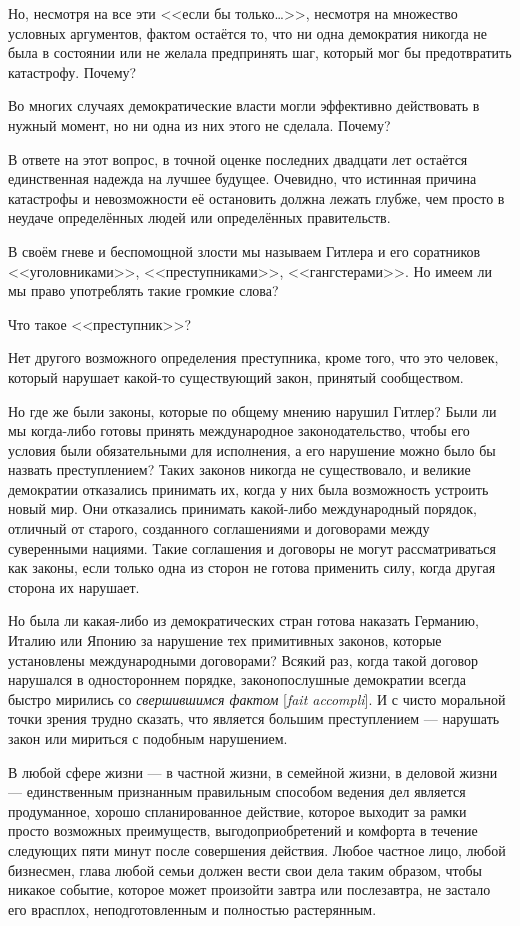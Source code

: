 Но, несмотря на все эти <<если бы только\ldots>>, несмотря на множество условных аргументов, фактом остаётся то, что ни одна демократия никогда не была в состоянии или не желала предпринять шаг, который мог бы предотвратить катастрофу. Почему?

Во многих случаях демократические власти могли эффективно действовать в нужный момент, но ни одна из них этого не сделала. Почему?

В ответе на этот вопрос, в точной оценке последних двадцати лет остаётся единственная надежда на лучшее будущее. Очевидно, что истинная причина катастрофы и невозможности её остановить должна лежать глубже, чем просто в неудаче определённых людей или определённых правительств.

В своём гневе и беспомощной злости мы называем Гитлера и его соратников <<уголовниками>>, <<преступниками>>, <<гангстерами>>. Но имеем ли мы право употреблять такие громкие слова?

Что такое <<преступник>>?

Нет другого возможного определения преступника, кроме того, что это человек, который нарушает какой-то существующий закон, принятый сообществом.

Но где же были законы, которые по общему мнению нарушил Гитлер? Были ли мы когда-либо готовы принять международное законодательство, чтобы его условия были обязательными для исполнения, а его нарушение можно было бы назвать преступлением? Таких законов никогда не существовало, и великие демократии отказались принимать их, когда у них была возможность устроить новый мир. Они отказались принимать какой-либо международный порядок, отличный от старого, созданного соглашениями и договорами между суверенными нациями. Такие соглашения и договоры не могут рассматриваться как законы, если только одна из сторон не готова применить силу, когда другая сторона их нарушает.

Но была ли какая-либо из демократических стран готова наказать Германию, Италию или Японию за нарушение тех примитивных законов, которые установлены международными договорами? Всякий раз, когда такой договор нарушался в одностороннем порядке, законопослушные демократии всегда быстро мирились со \textit{свершившимся фактом} [\textit{fait accompli}]. И с чисто моральной точки зрения трудно сказать, что является большим преступлением — нарушать закон или мириться с подобным нарушением.

В любой сфере жизни — в частной жизни, в семейной жизни, в деловой жизни — единственным признанным правильным способом ведения дел является продуманное, хорошо спланированное действие, которое выходит за рамки просто возможных преимуществ, выгодоприобретений и комфорта в течение следующих пяти минут после совершения действия. Любое частное лицо, любой бизнесмен, глава любой семьи должен вести свои дела таким образом, чтобы никакое событие, которое может произойти завтра или послезавтра, не застало его врасплох, неподготовленным и полностью растерянным.

